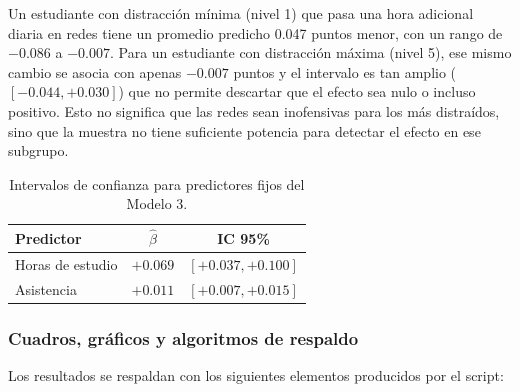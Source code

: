 \documentclass[12pt]{article}
\begin{document}
Un estudiante con distracción mínima (nivel 1) que pasa una hora adicional diaria en redes tiene un promedio predicho 0.047 puntos menor, con un rango de \(-0.086\) a \(-0.007\). Para un estudiante con distracción máxima (nivel 5), ese mismo cambio se asocia con apenas \(-0.007\) puntos y el intervalo es tan amplio (\([-0.044, +0.030]\)) que no permite descartar que el efecto sea nulo o incluso positivo. Esto no significa que las redes sean inofensivas para los más distraídos, sino que la muestra no tiene suficiente potencia para detectar el efecto en ese subgrupo.

\begin{table}[H]
\centering
\caption{Intervalos de confianza para predictores fijos del Modelo 3.}
\begin{tabular}{lcc}
\toprule
Predictor & \(\hat\beta\) & IC 95\% \\
\midrule
Horas de estudio & \(+0.069\) & \([+0.037, +0.100]\) \\
Asistencia & \(+0.011\) & \([+0.007, +0.015]\) \\
\bottomrule
\end{tabular}
\label{tab:ic_predictores_fijos}
\end{table}

\subsubsection{Cuadros, gráficos y algoritmos de respaldo}

Los resultados se respaldan con los siguientes elementos producidos por el script:
\end{document}
